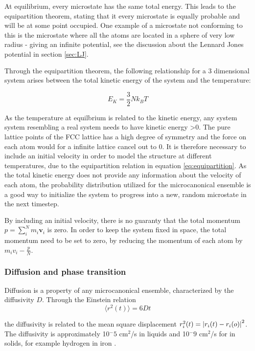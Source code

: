 At equilibrium, every microstate has the same total energy. This leads to  the equipartition theorem, stating that it every microstate is equally probable and will be at some point occupied. One example of a microstate not conforming to this is the microstate where all the atoms are located in a sphere of very low radius - giving an infinite potential, see the discussion about the Lennard Jones potential in section \ref{sec:LJ}. 

Through the equipartition theorem, the following relationship for a 3 dimensional system arises between the total kinetic energy of the system and the temperature:

\begin{equation}\label{eq:equipartition}
E_K = \frac{3	}{2}Nk_BT
\end{equation}

As the temperature at equilbrium is related to the kinetic energy, any system system resembling a real system needs to have kinetic energy >0. The pure lattice points of the FCC lattice has a high degree of symmetry and the force on each atom would for a infinite lattice cancel out to 0. It is therefore necessary to include an initial velocity in order to model the structure at different temperatures, due to the equipartition relation in equation \ref{eq:equipartition}. As the total kinetic energy does not provide any information about the velocity of each atom, the probability distribution utilized for the microcanonical ensemble is a good way to initialize the system to progress into a new, random microstate in the next timestep. 

By including an initial velocity, there is no guaranty that the total momentum $ p = \sum\limits_{i}^{N} m_i\textbf{v}_i $ is zero. In order to keep the system fixed in space, the total momentum need to be set to zero, by reducing the momentum of each atom by $ m_iv_i - \frac{p}{N}$. 

\subsubsection{Diffusion and phase transition}
Diffusion is a property of any microcanonical ensemble, characterized by the diffusivity $ D $. Through the Einstein relation
\begin{equation}\label{eq:Einstein}
\langle r^2(t) \rangle = 6Dt
\end{equation}

the diffusivity is related to the mean square displacement $ r_i^2(t) = \abs{r_i(t) - r_i(o)}^2 $. The diffusivity is approximately 10$^-5$ cm$^2$/s in liquids and 10$^-9$ cm$^2$/s for in solids, for example hydrogen in iron \cite{wiki_diff}. 

